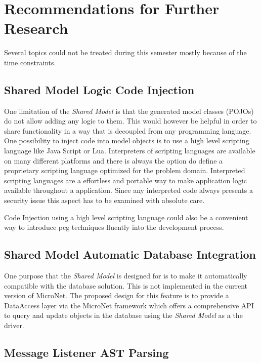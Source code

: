 \section{Recommendations for Further Research}
\label{sec:future_research}

Several topics could not be treated during this semester mostly because of the
time constraints.

\subsection{Shared Model Logic Code Injection}
\label{sub:model_code_injection}

One limitation of the \textit{Shared Model} is that the generated model classes
(POJOs) do not allow adding any logic to them. This would however be helpful in
order to share functionality in a way that is decoupled from any programming
language. One possibility to inject code into model objects is to use a high
level scripting language like Java Script or Lua. Interpreters of scripting
languages are available on many different platforms and there is always the
option do define a proprietary scripting language optimized for the problem
domain. Interpreted scripting languages are a effortless and portable way to
make application logic available throughout a \ms{} application. Since any
interpreted code always presents a security issue this aspect has to be examined
with absolute care.

Code Injection using a high level scripting language could also be a convenient
way to introduce \gls{pcg} techniques fluently into the \og{} development
process.

\subsection{Shared Model Automatic Database Integration}

One purpose that the \textit{Shared Model} is designed for is to make it
automatically compatible with the database solution. This is not implemented in
the current version of MicroNet. The proposed design for this feature is to
provide a DataAccess layer via the MicroNet framework which offers a
comprehensive API to query and update objects in the database using the
\textit{Shared Model} as a the driver.

\subsection{Message Listener AST Parsing}

